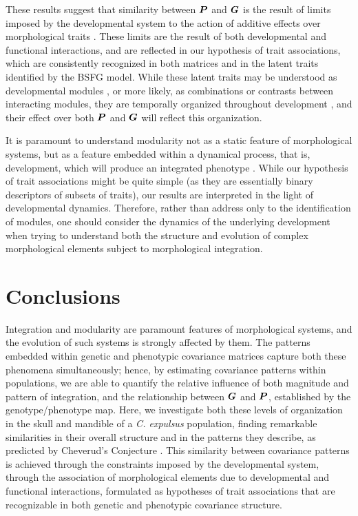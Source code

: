 \documentclass [twocolumn, natbib, nospthms, 10pt] {svjour3}
\begin{document}
These results suggest that similarity between $\boldsymbol{P}$ and $\boldsymbol{G}$ is
the result of limits imposed by the developmental system to the action
of additive effects over morphological traits \citep
{cheverud_quantitative_1984, wolf_developmental_2001}. These limits
are the result of both developmental and functional interactions, and
are reflected in our hypothesis of trait associations, which are
consistently recognized in both matrices and in the latent traits
identified by the BSFG model. While these latent traits may be
understood as developmental modules \citep{runcie_dissecting_2013}, or
more likely, as combinations or contrasts between interacting modules,
they are temporally organized throughout development
\citep{zelditch_ontogenetic_1989, hallgrimsson_mouse_2008}, and their
effect over both $\boldsymbol{P}$ and $\boldsymbol{G}$ will reflect this organization.

It is paramount to understand modularity not as a static feature of
morphological systems, but as a feature embedded within a dynamical
process, that is, development, which will produce an integrated
phenotype \citep {cheverud_developmental_1996, wagner_homologues_1996,
  hallgrimsson_deciphering_2009}. While our hypothesis of trait
associations might be quite simple (as they are essentially binary
descriptors of subsets of traits), our results are interpreted in the
light of developmental dynamics. Therefore, rather than address only
to the identification of modules, one should consider the dynamics of
the underlying development when trying to understand both the
structure and evolution of complex morphological elements subject to
morphological integration.

\section {Conclusions}

Integration and modularity are paramount features of morphological
systems, and the evolution of such systems is strongly affected by
them. The patterns embedded within genetic and phenotypic covariance
matrices capture both these phenomena simultaneously; hence, by
estimating covariance patterns within populations, we are able to
quantify the relative influence of both magnitude and pattern of
integration, and the relationship between $\boldsymbol{G}$ and $\boldsymbol{P}$,
established by the genotype/phenotype map. Here, we investigate both
these levels of organization in the skull and mandible of a
\emph{C. expulsus} population, finding remarkable similarities in
their overall structure and in the patterns they describe, as
predicted by Cheverud's Conjecture \citep{cheverud_comparison_1988,
  roff_estimation_1995}. This similarity between covariance patterns
is achieved through the constraints imposed by the developmental
system, through the association of morphological elements due to
developmental and functional interactions, formulated as hypotheses of
trait associations that are recognizable in both genetic and
phenotypic covariance structure.
\end{document}
